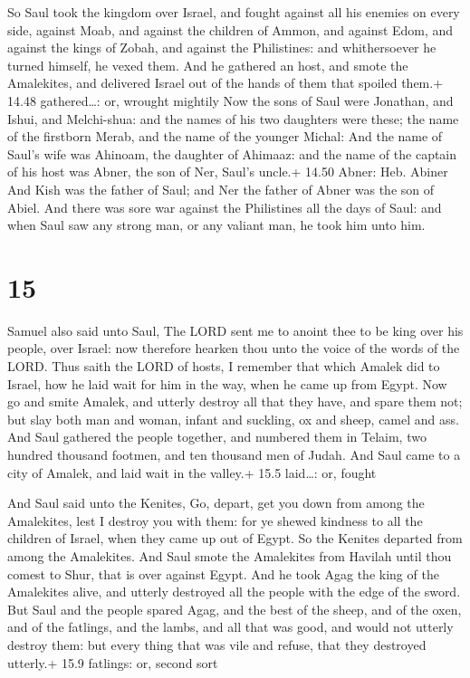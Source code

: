  So Saul took the kingdom over Israel, and fought against
all his enemies on every side, against Moab, and against the children of
Ammon, and against Edom, and against the kings of Zobah, and against the
Philistines: and whithersoever he turned himself, he vexed them.
 And he gathered an host, and smote the Amalekites, and
delivered Israel out of the hands of them that spoiled them.+ 14.48
gathered\ldots: or, wrought mightily  Now the sons of Saul
were Jonathan, and Ishui, and Melchi-shua: and the names of his two
daughters were these; the name of the firstborn Merab, and the name of
the younger Michal:  And the name of Saul's wife was
Ahinoam, the daughter of Ahimaaz: and the name of the captain of his
host was Abner, the son of Ner, Saul's uncle.+ 14.50 Abner: Heb. Abiner
 And Kish was the father of Saul; and Ner the father of
Abner was the son of Abiel.  And there was sore war against
the Philistines all the days of Saul: and when Saul saw any strong man,
or any valiant man, he took him unto him.

\hypertarget{section-14}{%
\section{15}\label{section-14}}

 Samuel also said unto Saul, The LORD sent me to anoint thee
to be king over his people, over Israel: now therefore hearken thou unto
the voice of the words of the LORD.  Thus saith the LORD of
hosts, I remember that which Amalek did to Israel, how he laid wait for
him in the way, when he came up from Egypt.  Now go and
smite Amalek, and utterly destroy all that they have, and spare them
not; but slay both man and woman, infant and suckling, ox and sheep,
camel and ass.  And Saul gathered the people together, and
numbered them in Telaim, two hundred thousand footmen, and ten thousand
men of Judah.  And Saul came to a city of Amalek, and laid
wait in the valley.+ 15.5 laid\ldots: or, fought

 And Saul said unto the Kenites, Go, depart, get you down
from among the Amalekites, lest I destroy you with them: for ye shewed
kindness to all the children of Israel, when they came up out of Egypt.
So the Kenites departed from among the Amalekites.  And Saul
smote the Amalekites from Havilah until thou comest to Shur, that is
over against Egypt.  And he took Agag the king of the
Amalekites alive, and utterly destroyed all the people with the edge of
the sword.  But Saul and the people spared Agag, and the
best of the sheep, and of the oxen, and of the fatlings, and the lambs,
and all that was good, and would not utterly destroy them: but every
thing that was vile and refuse, that they destroyed utterly.+ 15.9
fatlings: or, second sort

